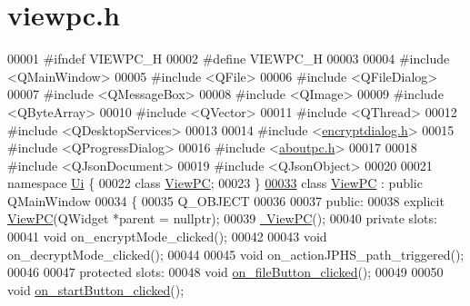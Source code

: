 \hypertarget{viewpc_8h_source}{}\section{viewpc.\+h}
\label{viewpc_8h_source}

\begin{DoxyCode}
00001 \textcolor{preprocessor}{#ifndef VIEWPC\_H}
00002 \textcolor{preprocessor}{#define VIEWPC\_H}
00003 
00004 \textcolor{preprocessor}{#include <QMainWindow>}
00005 \textcolor{preprocessor}{#include <QFile>}
00006 \textcolor{preprocessor}{#include <QFileDialog>}
00007 \textcolor{preprocessor}{#include <QMessageBox>}
00008 \textcolor{preprocessor}{#include <QImage>}
00009 \textcolor{preprocessor}{#include <QByteArray>}
00010 \textcolor{preprocessor}{#include <QVector>}
00011 \textcolor{preprocessor}{#include <QThread>}
00012 \textcolor{preprocessor}{#include <QDesktopServices>}
00013 
00014 \textcolor{preprocessor}{#include <\mbox{\hyperlink{encryptdialog_8h}{encryptdialog.h}}>}
00015 \textcolor{preprocessor}{#include <QProgressDialog>}
00016 \textcolor{preprocessor}{#include <\mbox{\hyperlink{aboutpc_8h}{aboutpc.h}}>}
00017 
00018 \textcolor{preprocessor}{#include <QJsonDocument>}
00019 \textcolor{preprocessor}{#include <QJsonObject>}
00020 
00021 \textcolor{keyword}{namespace }\mbox{\hyperlink{namespace_ui}{Ui}} \{
00022 \textcolor{keyword}{class }\mbox{\hyperlink{class_view_p_c}{ViewPC}};
00023 \}
\mbox{\hyperlink{class_view_p_c}{00033}} \textcolor{keyword}{class }\mbox{\hyperlink{class_view_p_c}{ViewPC}} : \textcolor{keyword}{public} QMainWindow
00034 \{
00035     Q\_OBJECT
00036 
00037 \textcolor{keyword}{public}:
00038     \textcolor{keyword}{explicit} \mbox{\hyperlink{class_view_p_c_a33c96c61f61042319c66c19059836b7f}{ViewPC}}(QWidget *parent = \textcolor{keyword}{nullptr});
00039     \mbox{\hyperlink{class_view_p_c_a91c51f5c1e6ed5ab12b410339f469b0f}{~ViewPC}}();
00040 \textcolor{keyword}{private} slots:
00041     \textcolor{keywordtype}{void} on\_encryptMode\_clicked();
00042 
00043     \textcolor{keywordtype}{void} on\_decryptMode\_clicked();
00044 
00045     \textcolor{keywordtype}{void} on\_actionJPHS\_path\_triggered();
00046 
00047 \textcolor{keyword}{protected} slots:
00048     \textcolor{keywordtype}{void} \mbox{\hyperlink{class_view_p_c_a3b9b7a7be9702d8b160f257f1c74a776}{on\_fileButton\_clicked}}();
00049 
00050     \textcolor{keywordtype}{void} \mbox{\hyperlink{class_view_p_c_a456d75b7c5d3a089302a576e7359f1f4}{on\_startButton\_clicked}}();

\end{DoxyCode}
